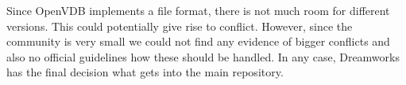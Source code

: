 Since OpenVDB implements a file format, there is not much room for different versions. This could potentially give rise to conflict. However, since the community is very small we could not find any evidence of bigger conflicts and also no official guidelines how these should be handled. In any case, Dreamworks has the final decision what gets into the main repository.


